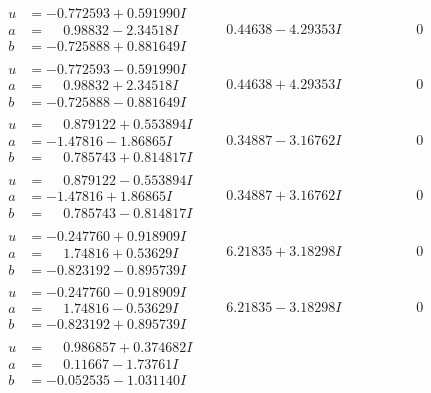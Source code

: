 \documentclass[1p]{elsarticle_modified}
\theoremstyle{definition}
\begin{document}
$$\begin{array}{c|c|c}
\begin{aligned}
u &= -0.772593 + 0.591990 I \\
a &= \phantom{-}0.98832 - 2.34518 I \\
b &= -0.725888 + 0.881649 I\end{aligned}
 & \phantom{-}0.44638 - 4.29353 I & \phantom{-0.000000 } 0 \\ \hline\begin{aligned}
u &= -0.772593 - 0.591990 I \\
a &= \phantom{-}0.98832 + 2.34518 I \\
b &= -0.725888 - 0.881649 I\end{aligned}
 & \phantom{-}0.44638 + 4.29353 I & \phantom{-0.000000 } 0 \\ \hline\begin{aligned}
u &= \phantom{-}0.879122 + 0.553894 I \\
a &= -1.47816 - 1.86865 I \\
b &= \phantom{-}0.785743 + 0.814817 I\end{aligned}
 & \phantom{-}0.34887 - 3.16762 I & \phantom{-0.000000 } 0 \\ \hline\begin{aligned}
u &= \phantom{-}0.879122 - 0.553894 I \\
a &= -1.47816 + 1.86865 I \\
b &= \phantom{-}0.785743 - 0.814817 I\end{aligned}
 & \phantom{-}0.34887 + 3.16762 I & \phantom{-0.000000 } 0 \\ \hline\begin{aligned}
u &= -0.247760 + 0.918909 I \\
a &= \phantom{-}1.74816 + 0.53629 I \\
b &= -0.823192 - 0.895739 I\end{aligned}
 & \phantom{-}6.21835 + 3.18298 I & \phantom{-0.000000 } 0 \\ \hline\begin{aligned}
u &= -0.247760 - 0.918909 I \\
a &= \phantom{-}1.74816 - 0.53629 I \\
b &= -0.823192 + 0.895739 I\end{aligned}
 & \phantom{-}6.21835 - 3.18298 I & \phantom{-0.000000 } 0 \\ \hline\begin{aligned}
u &= \phantom{-}0.986857 + 0.374682 I \\
a &= \phantom{-}0.11667 - 1.73761 I \\
b &= -0.052535 - 1.031140 I\end{aligned}

\end{array}$$
\end{document}
